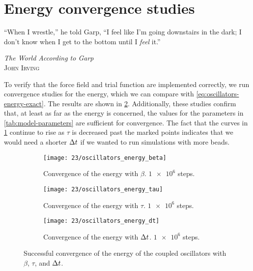 \section{Energy convergence studies}

\label{sec:oscillators-energy-convergence}

\epigraph{
``When I wrestle,'' he told Garp, ``I feel like I'm going downstairs in the dark; I don't know when I get to the bottom until I \emph{feel} it.''
}{
\textit{The World According to Garp} \\
\textsc{John Irving}
}

To verify that the force field and trial function are implemented correctly, we run convergence studies for the energy, which we can compare with \cref{eq:oscillators-energy-exact}.
The results are shown in \cref{fig:oscillators-energy}.
Additionally, these studies confirm that, at least as far as the energy is concerned, the values for the parameters in \vref{tab:model-parameters} are sufficient for convergence.
The fact that the curves in \cref{fig:oscillators-energy-tau} continue to rise as $\tau$ is decreased past the marked points indicates that we would need a shorter $\Delta t$ if we wanted to run simulations with more beads.

\begin{figure}
	\setlength{\figspacing}{5 mm}
	\centering
	\begin{subfigure}[b]{\textwidth}
		\texttt{[image: 23/oscillators\_energy\_beta]}
		\caption{
			Convergence of the energy with $\beta$.
			$\num{1e6}$ steps.
		}
		\vspace{\figspacing}
	\end{subfigure}
	\begin{subfigure}[b]{\textwidth}
		\texttt{[image: 23/oscillators\_energy\_tau]}
		\caption{
			Convergence of the energy with $\tau$.
			$\num{1e6}$ steps.
		}
		\label{fig:oscillators-energy-tau}
		\vspace{\figspacing}
	\end{subfigure}
	\begin{subfigure}[b]{\textwidth}
		\texttt{[image: 23/oscillators\_energy\_dt]}
		\caption{
			Convergence of the energy with $\Delta t$.
			$\num{1e6}$ steps.
		}
	\end{subfigure}
	\caption[
		Convergence of energy for coupled oscillators
	]{
		Successful convergence of the energy of the coupled oscillators with $\beta$, $\tau$, and $\Delta t$.
		\explainplotentropy{}
	}
	\label{fig:oscillators-energy}
\end{figure}
